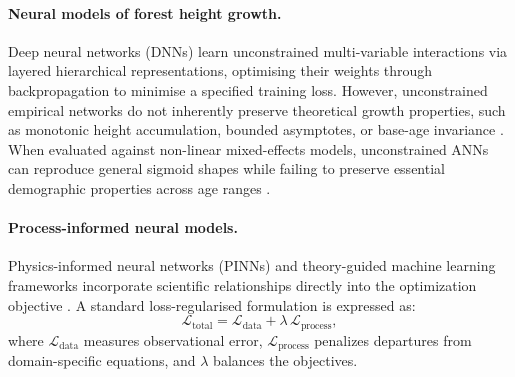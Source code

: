 \documentclass[logo,msc,ai]{infthesis}           %
\newcommand{\ai}[1]{\textcolor{brown}{[AI: #1]}}
\begin{document}
\paragraph*{Neural models of forest height growth.}
Deep neural networks (DNNs) learn unconstrained multi-variable interactions via layered hierarchical representations, optimising their weights through backpropagation to minimise a specified training loss. However, unconstrained empirical networks do not inherently preserve theoretical growth properties, such as monotonic height accumulation, bounded asymptotes, or base-age invariance \cite{ercanli2023Comparison_C4_NN,karatepe2022Total_C4_NN}. When evaluated against non-linear mixed-effects models, unconstrained ANNs can reproduce general sigmoid shapes while failing to preserve essential demographic properties across age ranges \cite{ercanli2023Comparison_C4_NN}.


\paragraph*{Process-informed neural models.}
Physics-informed neural networks (PINNs) and theory-guided machine learning frameworks incorporate scientific relationships directly into the optimization objective \cite{karpatne2017Theory_C4_NN,raissi2019Physics_C4_NN,karniadakis2021Physics_C4_NN,willard2022Integrating_C4_NN}. A standard loss-regularised formulation is expressed as:
\begin{equation}
\mathcal{L}_{\text{total}} = \mathcal{L}_{\text{data}} + \lambda\,\mathcal{L}_{\text{process}},
\label{eq:pinn-loss-general}
\end{equation}
where $\mathcal{L}_{\text{data}}$ measures observational error, $\mathcal{L}_{\text{process}}$ penalizes departures from domain-specific equations, and $\lambda$ balances the objectives. 
\end{document}
